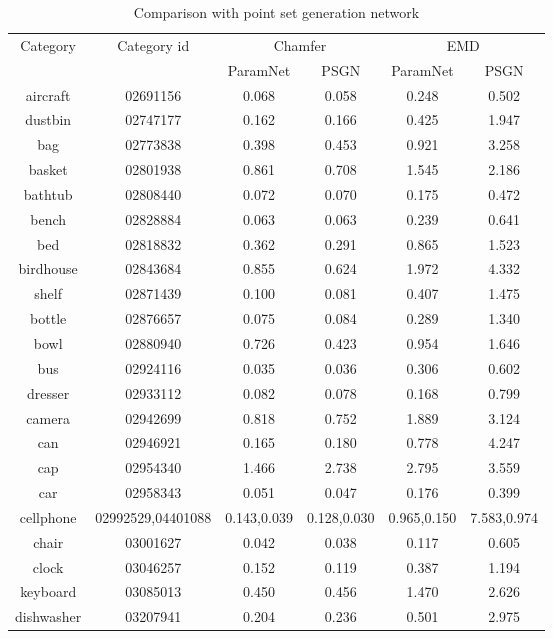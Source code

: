 \begin{table}
	\caption{Comparison with point set generation network\cite{PSGN}}
	\label{tab:seg}
	\centering
	\begin{tabular}{c c c c c c}
		\multirow{2}{*}{Category} & \multirow{2}{*}{Category id} & \multicolumn{2}{c}{Chamfer} & \multicolumn{2}{c}{EMD}\\ \cmidrule(lr){3-4} \cmidrule(lr){5-6}
		&	& ParamNet & PSGN\cite{PSGN}       & ParamNet & PSGN\cite{PSGN}\\
		\hline
		aircraft & 02691156 & 0.068 & 0.058 & 0.248 & 0.502 \\   
		dustbin & 02747177 & 0.162 & 0.166 & 0.425 & 1.947 \\
		bag & 02773838  & 0.398 & 0.453 & 0.921 & 3.258 \\
		basket & 02801938 & 0.861 & 0.708 & 1.545 & 2.186 \\
		bathtub & 02808440 & 0.072 & 0.070 & 0.175 & 0.472 \\
		bench & 02828884 & 0.063 & 0.063 & 0.239 & 0.641 \\
		bed & 02818832 & 0.362 & 0.291 & 0.865 & 1.523 \\
		birdhouse & 02843684 & 0.855 & 0.624 & 1.972 & 4.332 \\
		shelf & 02871439 & 0.100 & 0.081 & 0.407 & 1.475 \\
		bottle & 02876657 & 0.075 & 0.084 & 0.289 & 1.340 \\
		bowl & 02880940 & 0.726 & 0.423 & 0.954 & 1.646 \\
		bus & 02924116 & 0.035 & 0.036 & 0.306 & 0.602\\
		dresser & 02933112 & 0.082 & 0.078 & 0.168 & 0.799 \\
		camera & 02942699 & 0.818 & 0.752 & 1.889 & 3.124 \\
		can & 02946921 & 0.165 & 0.180 & 0.778 & 4.247 \\
		cap & 02954340 & 1.466 & 2.738 & 2.795 & 3.559 \\
		car & 02958343 & 0.051 & 0.047 & 0.176 & 0.399 \\
		cellphone & 02992529,04401088 & 0.143,0.039 & 0.128,0.030& 0.965,0.150 & 7.583,0.974\\
		chair & 03001627 & 0.042 & 0.038 & 0.117 & 0.605 \\
		clock & 03046257 & 0.152 & 0.119 & 0.387 & 1.194 \\
		keyboard & 03085013 & 0.450 & 0.456 & 1.470 & 2.626\\
		dishwasher & 03207941 & 0.204 & 0.236 & 0.501 & 2.975 \\

\end{tabular}
\end{table}
